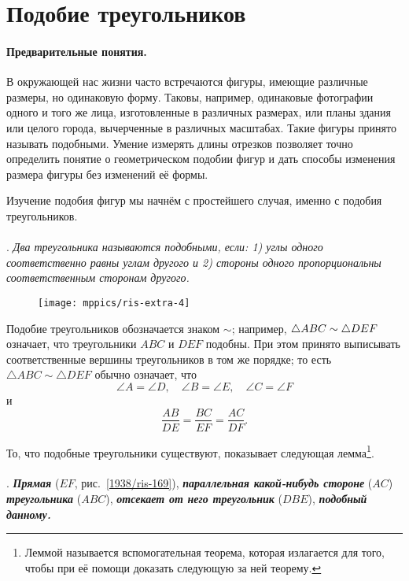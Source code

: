 \section{Подобие треугольников}

\paragraph{Предварительные понятия.}\label{1938/156}
В окружающей нас жизни часто встречаются фигуры, имеющие различные размеры, но одинаковую форму.
Таковы, например, одинаковые фотографии одного и того же лица, изготовленные в различных размерах, или планы здания или целого города, вычерченные в различных масштабах. 
Такие фигуры принято называть подобными.
Умение измерять длины отрезков позволяет точно определить понятие о геометрическом подобии фигур и дать способы изменения размера фигуры без изменений её формы.

Изучение подобия фигур мы начнём с простейшего случая, именно с подобия треугольников.

\paragraph{}\label{1938/158}
.
\emph{Два треугольника называются подобными, если:
1) углы одного соответственно равны углам другого и 
2) стороны одного пропорциональны соответственным сторонам другого.}

\begin{figure}[h!]
\centering
\texttt{[image: mppics/ris-extra-4]}
\caption{}\label{extra/ris-4}
\end{figure}

Подобие треугольников обозначается знаком $\sim$;
например, $\triangle ABC\z\sim \triangle DEF$ означает, что треугольники $ABC$ и $DEF$ подобны.
При этом принято выписывать соответственные вершины треугольников в том же порядке;
то есть  $\triangle ABC\sim \triangle DEF$ обычно означает, что 
\[\angle A=\angle D,\quad
 \angle B=\angle E,\quad
 \angle C=\angle F
\]
и
\[\frac{AB}{DE}=\frac{BC}{EF}=\frac{AC}{DF}.\]

То, что подобные треугольники существуют, показывает следующая лемма\footnote{Леммой называется вспомогательная теорема, которая излагается для того, чтобы при её помощи доказать следующую за ней теорему.}.

\paragraph{}\label{1938/159}
.
\textbf{\emph{Прямая}} ($EF$, рис.~\ref{1938/ris-169}), \textbf{\emph{параллельная какой-нибудь стороне}} ($AC$) \textbf{\emph{треугольника}} ($ABC$), \textbf{\emph{отсекает от него треугольник}} ($DBE$), \textbf{\emph{подобный данному.}}


